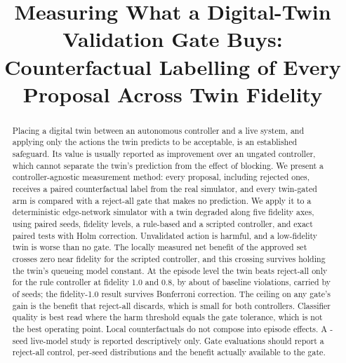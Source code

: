 \documentclass[conference]{IEEEtran}
\begin{document}
\title{Measuring What a Digital-Twin Validation Gate Buys: Counterfactual Labelling of Every Proposal Across Twin Fidelity}

\author{
}

\maketitle

\begin{abstract}
Placing a digital twin between an autonomous controller and a live system, and applying only the actions the twin predicts to be acceptable, is an established safeguard. Its value is usually reported as improvement over an ungated controller, which cannot separate the twin's prediction from the effect of blocking. We present a controller-agnostic measurement method: every proposal, including rejected ones, receives a paired counterfactual label from the real simulator, and every twin-gated arm is compared with a reject-all gate that makes no prediction. We apply it to a deterministic edge-network simulator with a twin degraded along five fidelity axes, using \NSeeds{} paired seeds, \NFidelity{} fidelity levels, a rule-based and a scripted controller, and exact paired tests with Holm correction. Unvalidated action is harmful, and a low-fidelity twin is worse than no gate. The locally measured net benefit of the approved set crosses zero near fidelity \ScrCrossII{} for the scripted controller, and this crossing survives holding the twin's queueing model constant. At the episode level the twin beats reject-all only for the rule controller at fidelity 1.0 and 0.8, by about \RuleTenPctBaseline{} of baseline violations, carried by \RuleTenPctSeeds{} of seeds; the fidelity-1.0 result survives Bonferroni correction. The ceiling on any gate's gain is the benefit that reject-all discards, which is small for both controllers. Classifier quality is best read where the harm threshold equals the gate tolerance, which is not the best operating point. Local counterfactuals do not compose into episode effects. A \LLMSeeds-seed live-model study is reported descriptively only. Gate evaluations should report a reject-all control, per-seed distributions and the benefit actually available to the gate.
\end{abstract}
\end{document}

